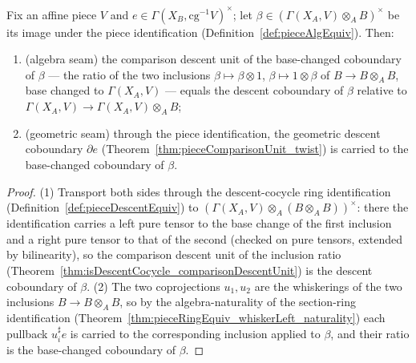 \begin{theorem}
  \label{thm:geomCoboundary_seams}
  \leanok
  Fix an affine piece \(V\) and \(e \in \Gamma(X_B, \mathrm{cg}^{-1}V)^{\times}\); let \(\beta \in
  (\Gamma(X_A, V) \otimes_A B)^{\times}\) be its image under the piece identification
  (Definition~\ref{def:pieceAlgEquiv}). Then:
  \begin{enumerate}
    \item \textup{(algebra seam)} the comparison descent unit of the base-changed coboundary of
      \(\beta\) --- the ratio of the two inclusions \(\beta \mapsto \beta \otimes 1\), \(\beta
      \mapsto 1 \otimes \beta\) of \(B \to B \otimes_A B\), base changed to \(\Gamma(X_A, V)\) ---
      equals the descent coboundary of \(\beta\) relative to \(\Gamma(X_A, V) \to \Gamma(X_A, V)
      \otimes_A B\);
    \item \textup{(geometric seam)} through the piece identification, the geometric descent coboundary
      \(\partial e\) (Theorem~\ref{thm:pieceComparisonUnit_twist}) is carried to the base-changed
      coboundary of \(\beta\).
  \end{enumerate}
\end{theorem}
\begin{proof}
  \leanok
  (1) Transport both sides through the descent-cocycle ring identification
  (Definition~\ref{def:pieceDescentEquiv}) to \((\Gamma(X_A, V) \otimes_A (B \otimes_A B))^{\times}\):
  there the identification carries a left pure tensor to the base change of the first inclusion and a
  right pure tensor to that of the second (checked on pure tensors, extended by bilinearity), so the
  comparison descent unit of the inclusion ratio (Theorem~\ref{thm:isDescentCocycle_comparisonDescentUnit})
  is the descent coboundary of \(\beta\). (2) The two coprojections \(u_1, u_2\) are the whiskerings
  of the two inclusions \(B \to B \otimes_A B\), so by the algebra-naturality of the section-ring
  identification (Theorem~\ref{thm:pieceRingEquiv_whiskerLeft_naturality}) each pullback \(u_i^{\sharp}
  e\) is carried to the corresponding inclusion applied to \(\beta\), and their ratio is the
  base-changed coboundary of \(\beta\).
\end{proof}

